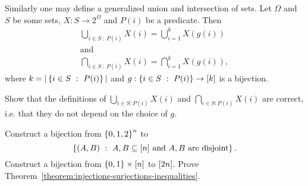 Similarly one may define a generalized union and intersection of sets.
Let $\Omega$ and $S$ be some sets, $X : S \to 2^\Omega$ and $P(i)$ be a
predicate. Then
\begin{gather*}
    \bigcup_{i \in S ~:~ P(i)} X(i) = \bigcup_{i = 1}^k X(g(i)) \\
    \text{and}\\
    \bigcap_{i \in S ~:~ P(i)} X(i) = \bigcap_{i = 1}^k X(g(i)),
\end{gather*}
where $k = |\set[P(i)]{i \in S}|$ and $g : \set[P(i)]{i \in S} \to \range{k}$ is
a bijection.

\begin{exercise}
    Show that the definitions of $\bigcup_{i \in S : P(i)} X(i)$ and
    $\bigcap_{i \in S : P(i)} X(i)$ are correct,
    i.e. that they do not depend on the choice of $g$.
\end{exercise}


\begin{chapterendexercises}
    \exercise Construct a bijection from $\set{0, 1, 2}^n$ to
        \[
          \set[{A, B \subseteq \range{n} \text{ and } A, B \text{ are disjoint}}]{(A, B)}.
        \]
    \exercise[recommended] Construct a bijection from
        $\set{0, 1} \times \range{n}$ to ${[{2n}]}$.
    \exercise Prove Theorem~\ref{theorem:injections-surjections-inequalities}.
\end{chapterendexercises}
